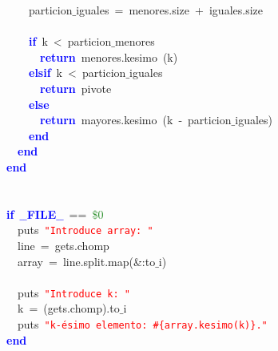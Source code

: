 \mbox{}\ \ \ \ particion$\_$iguales\ \textcolor{BrickRed}{=}\ menores\textcolor{BrickRed}{.}size\ \textcolor{BrickRed}{+}\ iguales\textcolor{BrickRed}{.}size \\
\mbox{} \\
\mbox{}\ \ \ \ \textbf{\textcolor{Blue}{if}}\ k\ \textcolor{BrickRed}{\textless{}}\ particion$\_$menores \\
\mbox{}\ \ \ \ \ \ \textbf{\textcolor{Blue}{return}}\ menores\textcolor{BrickRed}{.}kesimo\ \textcolor{BrickRed}{(}k\textcolor{BrickRed}{)} \\
\mbox{}\ \ \ \ \textbf{\textcolor{Blue}{elsif}}\ k\ \textcolor{BrickRed}{\textless{}}\ particion$\_$iguales \\
\mbox{}\ \ \ \ \ \ \textbf{\textcolor{Blue}{return}}\ pivote \\
\mbox{}\ \ \ \ \textbf{\textcolor{Blue}{else}} \\
\mbox{}\ \ \ \ \ \ \textbf{\textcolor{Blue}{return}}\ mayores\textcolor{BrickRed}{.}kesimo\ \textcolor{BrickRed}{(}k\ \textcolor{BrickRed}{-}\ particion$\_$iguales\textcolor{BrickRed}{)} \\
\mbox{}\ \ \ \ \textbf{\textcolor{Blue}{end}} \\
\mbox{}\ \ \textbf{\textcolor{Blue}{end}} \\
\mbox{}\textbf{\textcolor{Blue}{end}} \\
\mbox{} \\
\mbox{} \\
\mbox{}\textbf{\textcolor{Blue}{if}}\ \textbf{\textcolor{Blue}{$\_$$\_$FILE$\_$$\_$}}\ \textcolor{BrickRed}{==}\ \textcolor{ForestGreen}{\$0} \\
\mbox{}\ \ puts\ \texttt{\textcolor{Red}{"{}Introduce\ array:\ "{}}} \\
\mbox{}\ \ line\ \textcolor{BrickRed}{=}\ gets\textcolor{BrickRed}{.}chomp \\
\mbox{}\ \ array\ \textcolor{BrickRed}{=}\ line\textcolor{BrickRed}{.}split\textcolor{BrickRed}{.}map\textcolor{BrickRed}{(\&:}to$\_$i\textcolor{BrickRed}{)} \\
\mbox{} \\
\mbox{}\ \ puts\ \texttt{\textcolor{Red}{"{}Introduce\ k:\ "{}}} \\
\mbox{}\ \ k\ \textcolor{BrickRed}{=}\ \textcolor{BrickRed}{(}gets\textcolor{BrickRed}{.}chomp\textcolor{BrickRed}{).}to$\_$i \\
\mbox{}\ \ puts\ \texttt{\textcolor{Red}{"{}k-ésimo\ elemento:\ \#\{array.kesimo(k)\}."{}}} \\
\mbox{}\textbf{\textcolor{Blue}{end}} \\
\mbox{}
